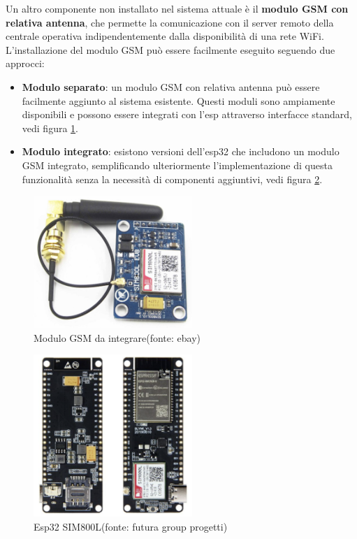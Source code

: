 \documentclass[12pt, a4paper, italian]{report}
\numberwithin{figure}{chapter}
\numberwithin{table}{chapter}
\begin{document}
Un altro componente non installato nel sistema attuale è il \textbf{modulo GSM con relativa antenna}, che permette la comunicazione con il server remoto della centrale operativa indipendentemente dalla disponibilità di una rete WiFi.
L'installazione del modulo GSM può essere facilmente eseguito seguendo due approcci: 

\begin{itemize}
    \item \textbf{Modulo separato}: un modulo GSM con relativa antenna può essere facilmente aggiunto al sistema esistente. Questi moduli sono ampiamente disponibili e possono essere integrati con l'esp attraverso interfacce standard, vedi figura  \ref{fig:modulo_gsm}.
    \item \textbf{Modulo integrato}: esistono versioni dell'esp32 che includono un modulo GSM integrato, semplificando ulteriormente l'implementazione di questa funzionalità senza la necessità di componenti aggiuntivi, vedi figura \ref{fig:esp32_gsm}.
\end{itemize}

\begin{figure}[h]
  \centering
  \includegraphics[width=6cm]{gsm_module.png}
  \caption{Modulo GSM da integrare\protect\footnotemark (fonte: ebay)}
  \label{fig:modulo_gsm}
\end{figure}

\begin{figure}[h]
  \centering
  \includegraphics[width=6cm]{esp32_gsm.png}
  \caption{Esp32 SIM800L\protect\footnotemark (fonte: futura group progetti)}
  \label{fig:esp32_gsm}
\end{figure}
\end{document}

